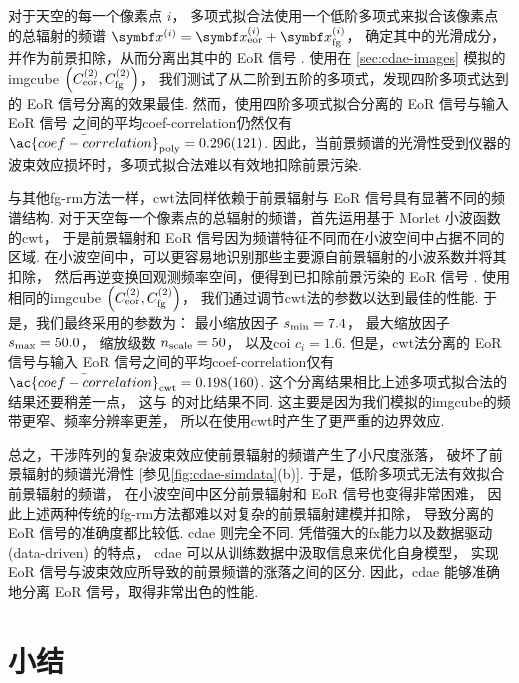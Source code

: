 对于天空的每一个像素点 $i$，
多项式拟合法使用一个低阶多项式来拟合该像素点的总辐射的频谱
$\B{x}^{(i)} = \B{x}^{(i)}_{\R{eor}} + \B{x}^{(i)}_{\R{fg}}$，
确定其中的光滑成分，并作为前景扣除，从而分离出其中的 EoR 信号 \cite{wang2006}.
使用在 \autoref{sec:cdae-images} 模拟的\ac{imgcube}
$\left( C_{\mathrm{eor}}^{(2)}, C_{\mathrm{fg}}^{(2)} \right)$，
我们测试了从二阶到五阶的多项式，发现四阶多项式达到的 EoR 信号分离的效果最佳.
然而，使用四阶多项式拟合分离的 EoR 信号与输入 EoR 信号
之间的平均\acl{coef-correlation}仍然仅有
$\bar{\ac{coef-correlation}}_{\R{poly}} = \num{0.296 +- 0.121}$.
因此，当前景频谱的光滑性受到仪器的波束效应损坏时，多项式拟合法难以有效地扣除前景污染.

与其他\ac{fg-rm}方法一样，\ac{cwt}法同样依赖于前景辐射与 EoR 信号具有显著不同的频谱结构.
对于天空每一个像素点的总辐射的频谱，首先运用基于 Morlet 小波函数的\ac{cwt}，
于是前景辐射和 EoR 信号因为频谱特征不同而在小波空间中占据不同的区域.
在小波空间中，可以更容易地识别那些主要源自前景辐射的小波系数并将其扣除，
然后再逆变换回观测频率空间，便得到已扣除前景污染的 EoR 信号 \cite{gu2013}.
使用相同的\ac{imgcube}
$\left( C_{\mathrm{eor}}^{(2)}, C_{\mathrm{fg}}^{(2)} \right)$，
我们通过调节\ac{cwt}法的参数以达到最佳的性能.
于是，我们最终采用的参数为：
最小缩放因子 $s_{\mathrm{min}} = 7.4$，
最大缩放因子 $s_{\mathrm{max}} = 50.0$，
缩放级数 $n_{\mathrm{scale}} = 50$，
以及\ac{coi} $c_i = 1.6$.
但是，\ac{cwt}法分离的 EoR 信号与输入 EoR 信号之间的平均\acl{coef-correlation}仅有
$\bar{\ac{coef-correlation}}_{\R{cwt}} = \num{0.198 +- 0.160}$.
这个分离结果相比上述多项式拟合法的结果还要稍差一点，
这与  的对比结果不同.
这主要是因为我们模拟的\ac{imgcube}的频带更窄、频率分辨率更差，
所以在使用\ac{cwt}时产生了更严重的边界效应.

总之，干涉阵列的复杂波束效应使前景辐射的频谱产生了小尺度涨落，
破坏了前景辐射的频谱光滑性 [参见\autoref{fig:cdae-simdata}(b)].
于是，低阶多项式无法有效拟合前景辐射的频谱，
在小波空间中区分前景辐射和 EoR 信号也变得非常困难，
因此上述两种传统的\ac{fg-rm}方法都难以对复杂的前景辐射建模并扣除，
导致分离的 EoR 信号的准确度都比较低.
\ac{cdae} 则完全不同.
凭借强大的\ac{fx}能力以及数据驱动 (data-driven) 的特点，
\ac{cdae} 可以从训练数据中汲取信息来优化自身模型，
实现 EoR 信号与波束效应所导致的前景频谱的涨落之间的区分.
因此，\ac{cdae} 能够准确地分离 EoR 信号，取得非常出色的性能.


\section{小结}

